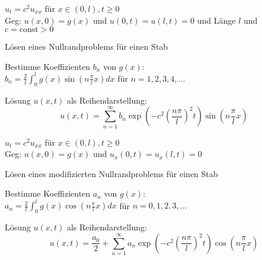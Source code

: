 \documentclass[german,color,5pt]{latex4ei/latex4ei_fs}
\begin{document}
\begin{sectionbox}
	\(u_{t}=c^{2}u_{xx}\) für \(x \in (0,l), t\geq 0\) \\
	Geg: \(u(x,0)=g(x)\) und \(u(0,t)=u(l,t)=0\) und Länge \(l\) und \(c=\mathrm{const}>0\)
	\begin{cookbox}{Lösen eines Nullrandproblems für einen Stab}
		\item Bestimme Koeffizienten \(b_{n}\) von \(g(x)\): \\
		\(b_{n}=\frac{2}{l} \int_{0}^{l} g(x)\sin\left(n\frac{\pi}{l}x\right)dx\) \qquad für \(n=1,2,3,4,... \)
		\item Lösung \(u(x,t)\) als Reihendarstellung: \vspace{-5pt}		 %
		\[u(x,t)=\sum_{n=1}^{\infty} b_{n} \exp\left(-c^{2}\left(\frac{n\pi}{l}\right)^{2}t\right)\sin\left(n\frac{\pi}{l}x\right)\]
	\end{cookbox}
	\(u_{t}=c^{2}u_{xx}\) für \(x \in (0,l), t\geq 0\) \\
	Geg: \(u(x,0)=g(x)\) und \(u_x(0,t)=u_x(l,t)=0\)
	\begin{cookbox}{Lösen eines modifizierten Nullrandproblems für einen Stab}
		\item Bestimme Koeffizienten \(a_{n}\) von \(g(x)\): \\
		\(a_{n}=\frac{2}{l} \int_{0}^{l} g(x)\cos\left(n\frac{\pi}{l}x\right)dx\) \qquad für \(n=0,1,2,3,... \)
		\item Lösung \(u(x,t)\) als Reihendarstellung: \vspace{-5pt}		 %
		\[u(x,t)=\frac{a_0}{2} + \sum_{n=1}^{\infty} a_{n} \exp\left(-c^{2}\left(\frac{n\pi}{l}\right)^{2}t\right)\cos\left(n\frac{\pi}{l}x\right)\]
	\end{cookbox}
\end{sectionbox}

\end{document}
